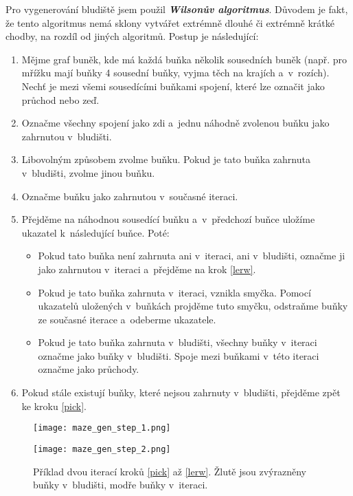 Pro vygenerování bludiště jsem použil \textit{\textbf{Wilsonův algoritmus}}. Důvodem je fakt, že tento algoritmus nemá sklony vytvářet extrémně dlouhé či extrémně krátké chodby, na rozdíl od jiných algoritmů. Postup je následující: \cite{enwiki:1193338583}

\begin{enumerate}
  \setcounter{enumi}{0}
  \item Mějme graf buněk, kde má každá buňka několik sousedních buněk (např. pro mřížku mají buňky 4 sousední buňky, vyjma těch na krajích a~v~rozích). Nechť je mezi všemi sousedícími buňkami spojení, které lze označit jako průchod nebo zeď.
  \item Označme všechny spojení jako zdi a~jednu náhodně zvolenou buňku jako zahrnutou v~bludišti. \label{init}
  \item Libovolným způsobem zvolme buňku. Pokud je tato buňka zahrnuta v~bludišti, zvolme jinou buňku. \label{pick}
  \item Označme buňku jako zahrnutou v~současné iteraci.
  \item Přejděme na náhodnou sousedící buňku a~v~předchozí buňce uložíme ukazatel k~následující buňce. Poté: \label{lerw}
        \begin{itemize}
          \item Pokud tato buňka není zahrnuta ani v~iteraci, ani v~bludišti, označme ji jako zahrnutou v~iteraci a~přejděme na krok \ref{lerw}.
          \item Pokud je tato buňka zahrnuta v~iteraci, vznikla smyčka. Pomocí ukazatelů uložených v~buňkách projděme tuto smyčku, odstraňme buň\-ky ze současné iterace a~odeberme ukazatele.
          \item Pokud je tato buňka zahrnuta v~bludišti, všechny buňky v~iteraci označme jako buňky v~bludišti. Spoje mezi buňkami v~této iteraci označme jako průchody.
        \end{itemize}
  \item Pokud stále existují buňky, které nejsou zahrnuty v~bludišti, přejděme zpět ke kroku \ref{pick}.
\end{enumerate}

\begin{figure}[H]
  \centering
  
  \begin{minipage}{.5\textwidth}
    \centering
    \texttt{[image: maze\_gen\_step\_1.png]}
  \end{minipage}%
  \begin{minipage}{.5\textwidth}
    \centering
    \texttt{[image: maze\_gen\_step\_2.png]}
  \end{minipage}
  
  \caption{Příklad dvou iterací kroků \ref{pick} až \ref{lerw}. Žlutě jsou zvýrazněny buňky v~bludišti, modře buňky v~iteraci.}
\end{figure}


